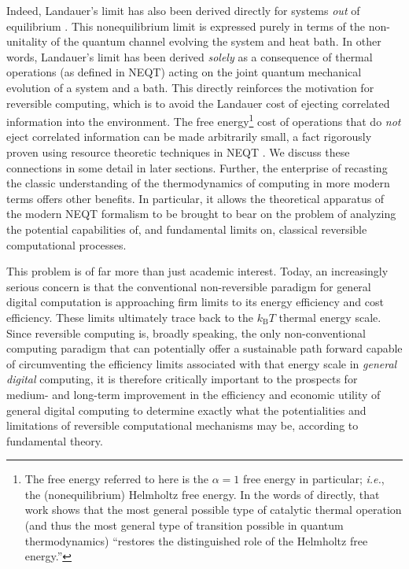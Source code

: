 \documentclass[preprints,article,accept,moreauthors,pdftex]{Definitions/mdpi}
\begin{document}
Indeed, Landauer's limit has also been derived directly for systems \emph{out} of equilibrium \cite{Goold15, GCGPVP17}. This nonequilibrium limit is expressed purely in terms of the non-unitality of the quantum channel evolving the system and heat bath. In other words, Landauer's limit has been derived \emph{solely} as a consequence of thermal operations (as defined in NEQT) acting on the joint quantum mechanical evolution of a system and a bath. This directly reinforces the motivation for reversible computing, which is to avoid the Landauer cost of ejecting correlated information into the environment. The free energy\footnote{The free energy referred to here is the $\alpha = 1$ free energy in particular; \emph{i.e.}, the (nonequilibrium) Helmholtz free energy. In the words of \cite{Mueller18} directly, that work shows that the most general possible type of catalytic thermal operation (and thus the most general type of transition possible in quantum thermodynamics) ``restores the distinguished role of the Helmholtz free energy.''} cost of operations that do \emph{not} eject correlated information can be made arbitrarily small, a fact rigorously proven using resource theoretic techniques in NEQT \cite{Mueller18}. We discuss these connections in some detail in later sections. Further, the enterprise of recasting the classic understanding of the thermodynamics of computing in more modern terms offers other benefits. In particular, it allows the theoretical apparatus of the modern NEQT formalism to be brought to bear on the problem of analyzing the potential capabilities of, and fundamental limits on, classical reversible computational processes.

This problem is of far more than just academic interest. Today, an increasingly serious concern is that the conventional non-reversible paradigm for general digital computation is approaching firm limits to its energy efficiency and cost efficiency. These limits ultimately trace back to the $k_{\mathrm{B}}T$ thermal energy scale. Since reversible computing is, broadly speaking, the only non-conventional computing paradigm that can potentially offer a sustainable path forward capable of circumventing the efficiency limits associated with that energy scale in \textit{general digital} computing, it is therefore critically important to the prospects for medium- and long-term improvement in the efficiency and economic utility of general digital computing to determine exactly what the potentialities and limitations of reversible computational mechanisms may be, according to fundamental theory.
\end{document}
